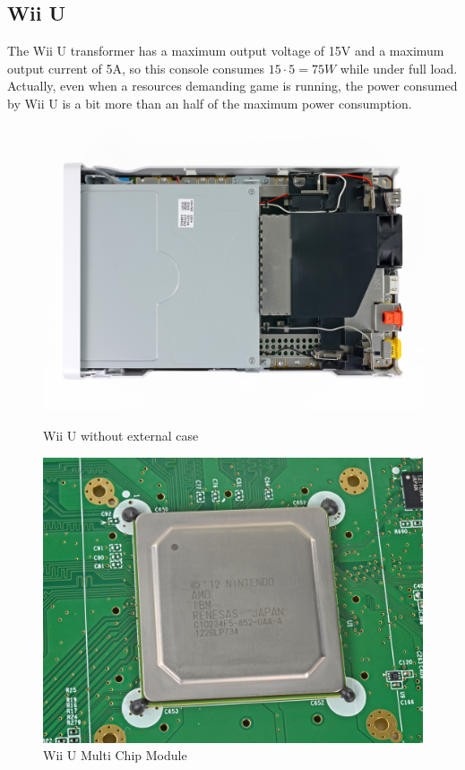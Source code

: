 \documentclass[11pt,a4paper,titlepage]{article}
\begin{document}
	\subsection{Wii U}
		The Wii U transformer has a maximum output voltage of 15V and a maximum output current of 5A, so this console consumes $15\cdot 5 = 75W$ while under full load. Actually, even when a resources demanding game is running, the power consumed by Wii U is a bit more than an half of the maximum power consumption.
		\begin{figure}[htbp]
			\centering
			\begin{minipage}{0.45\textwidth}
				\centering
				\includegraphics[width=\textwidth]{external_view.jpeg}
				\caption{Wii U without external case}
				\label{fig:external}
			\end{minipage}
			\hspace{0.5cm}
			\begin{minipage}{0.45\textwidth}
				\centering
				\includegraphics[width=\textwidth]{CPU_&_GPU.png}
				\caption{Wii U Multi Chip Module}
				\label{fig:mcm}
			\end{minipage}
		\end{figure}
\end{document}
